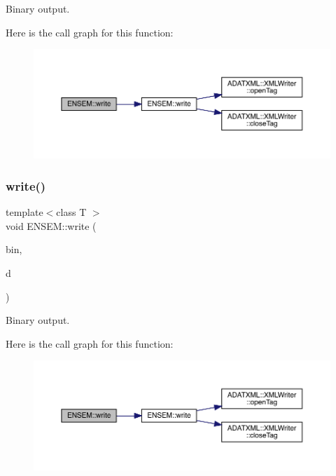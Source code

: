 Binary output. 

Here is the call graph for this function\+:\nopagebreak
\begin{figure}[H]
\begin{center}
\leavevmode
\includegraphics[width=350pt]{d2/d94/namespaceENSEM_a08ef39649c7f1ffb49d89bb6dc416676_cgraph}
\end{center}
\end{figure}
\mbox{\label{namespaceENSEM_afe08b2232fc0a37c7998d170fcf26ec0}} 
\subsubsection{\texorpdfstring{write()}{write()}\hspace{0.1cm}{\footnotesize\ttfamily [11/13]}}
{\footnotesize\ttfamily template$<$class T $>$ \\
void E\+N\+S\+E\+M\+::write (\begin{DoxyParamCaption}\item[{\mbox{\hyperlink{classADATIO_1_1BinaryWriter}{A\+D\+A\+T\+I\+O\+::\+Binary\+Writer}} \&}]{bin,  }\item[{const \mbox{\hyperlink{classENSEM_1_1Ensem}{Ensem}}$<$ \mbox{\hyperlink{classENSEM_1_1OTensor}{O\+Tensor}}$<$ T $>$ $>$ \&}]{d }\end{DoxyParamCaption})\hspace{0.3cm}{\ttfamily [inline]}}



Binary output. 

Here is the call graph for this function\+:\nopagebreak
\begin{figure}[H]
\begin{center}
\leavevmode
\includegraphics[width=350pt]{d2/d94/namespaceENSEM_afe08b2232fc0a37c7998d170fcf26ec0_cgraph}
\end{center}
\end{figure}
\mbox{\label{namespaceENSEM_a5360eb9dd0dfcdb3fcf8f085117ddf8a}} 
